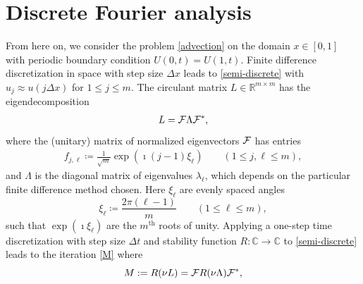 \documentclass[smallextended,numbook,runningheads]{svjour3}     %
\newcommand{\dt}{\Delta t}
\newcommand{\dx}{\Delta x}
\newcommand{\cF}{{\cal{F}}}
\begin{document}




\section{Discrete Fourier analysis}\label{sectiondiscFourier}
From here on, we consider the problem \eqref{advection} on the domain $x\in[0,1]$
with periodic boundary condition $U(0,t)=U(1,t)$.  Finite difference discretization
in space with step size $\dx$ leads to \eqref{semi-discrete} with $u_j\approx u(j\dx)$ for $1\le j\le m$. 
The circulant matrix $L\in\mathbb{R}^{m\times m}$ has the eigendecomposition \cite[Appendix C]{rjl:fdmbook}
\begin{align}\label{eigen}
    L  = \cF \Lambda \cF^*,
\end{align}
where the (unitary) matrix of normalized eigenvectors $\cF$ has entries
\begin{align}\label{eigenvectrors}
    f_{j,\ell}  \coloneqq \frac{1}{\sqrt{m}}\exp(\imath  (j-1) \xi_\ell)  \quad\quad (1 \le j, \ell \le m),
\end{align}
and $\Lambda$ is the diagonal matrix of eigenvalues $\lambda_\ell$, which depends on the
particular finite difference method chosen.  Here $\xi_\ell$ are evenly spaced angles 
\begin{equation}\label{xildef}
    \xi_\ell  \coloneqq \frac{2\pi(\ell-1)}{m} \quad\quad (1 \le \ell \le m),
\end{equation}
such that $\exp(\imath\xi_\ell)$ are the $m^\text{th}$ roots of unity.
Applying a one-step time
discretization with step size $\dt$ and stability function $R:\mathbb{C}\to\mathbb{C}$ to \eqref{semi-discrete} leads to
the iteration \eqref{M}
where 
\begin{equation*}
M:=R(\nu L)=\cF R(\nu \Lambda) \cF^*, 
\end{equation*}
\end{document}
